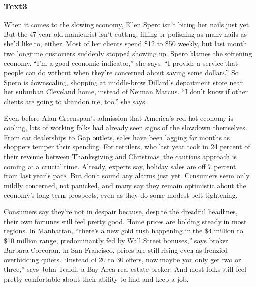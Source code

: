 \documentclass[a4paper]{article}
\begin{document}
\subsubsection{Text3}

\par
When it comes to the slowing economy, Ellen Spero isn’t biting her nails just yet. But the 47-year-old manicurist isn’t cutting, filling or polishing as many nails as she’d like to, either. Most of her clients spend \$12 to \$50 weekly, but last month two longtime customers suddenly stopped showing up. Spero blames the softening economy. “I’m a good economic indicator,” she says. “I provide a service that people can do without when they’re concerned about saving some dollars.” So Spero is downscaling, shopping at middle-brow Dillard’s department store near her suburban Cleveland home, instead of Neiman Marcus. “I don’t know if other clients are going to abandon me, too.” she says.

\par
Even before Alan Greenspan’s admission that America’s red-hot economy is cooling, lots of working folks had already seen signs of the slowdown themselves. From car dealerships to Gap outlets, sales have been lagging for months as shoppers temper their spending. For retailers, who last year took in 24 percent of their revenue between Thanksgiving and Christmas, the cautious approach is coming at a crucial time. Already, experts say, holiday sales are off 7 percent from last year’s pace. But don’t sound any alarms just yet. Consumers seem only mildly concerned, not panicked, and many say they remain optimistic about the economy’s long-term prospects, even as they do some modest belt-tightening.

\par
Consumers say they’re not in despair because, despite the dreadful headlines, their own fortunes still feel pretty good. Home prices are holding steady in most regions. In Manhattan, “there’s a new gold rush happening in the \$4 million to \$10 million range, predominantly fed by Wall Street bonuses,” says broker Barbara Corcoran. In San Francisco, prices are still rising even as frenzied overbidding quiets. “Instead of 20 to 30 offers, now maybe you only get two or three,” says John Tealdi, a Bay Area real-estate broker. And most folks still feel pretty comfortable about their ability to find and keep a job.
\end{document}
